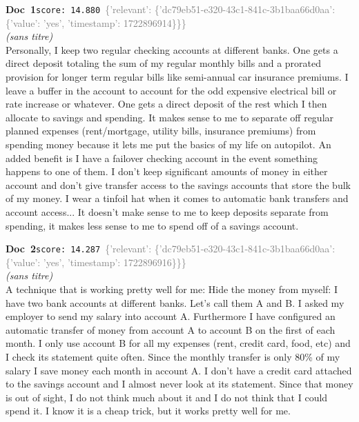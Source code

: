 \documentclass[a4paper,11pt]{article}
\begin{document}
\begin{docenv}
{\footnotesize\textcolor{doccolor}{\textbf{Doc~1}}}\hfill{\tiny\texttt{score:~14.880}}\ {\tiny\textcolor{gray}{\{'relevant': \{'dc79eb51-e320-43c1-841c-3b1baa66d0aa': \{'value': 'yes', 'timestamp': 1722896914\}\}\}}}\\[3pt]
{\small\textit{(sans titre)}}\\[2pt]
\vspace{2pt}
{\footnotesize 
Personally, I keep two regular checking accounts at different banks.  One gets a direct deposit totaling the sum of my regular monthly bills and a prorated provision for longer term regular bills like semi-annual car insurance premiums.  I leave a buffer in the account to account for the odd expensive electrical bill or rate increase or whatever.  One gets a direct deposit of the rest which I then allocate to savings and spending. It makes sense to me to separate off regular planned expenses (rent/mortgage, utility bills, insurance premiums) from spending money because it lets me put the basics of my life on autopilot.  An added benefit is I have a failover checking account in the event something happens to one of them.  I don't keep significant amounts of money in either account and don't give transfer access to the savings accounts that store the bulk of my money.  I wear a tinfoil hat when it comes to automatic bank transfers and account access... It doesn't make sense to me to keep deposits separate from spending, it makes less sense to me to spend off of a savings account.}
\end{docenv}
\begin{docenv}
{\footnotesize\textcolor{doccolor}{\textbf{Doc~2}}}\hfill{\tiny\texttt{score:~14.287}}\ {\tiny\textcolor{gray}{\{'relevant': \{'dc79eb51-e320-43c1-841c-3b1baa66d0aa': \{'value': 'yes', 'timestamp': 1722896916\}\}\}}}\\[3pt]
{\small\textit{(sans titre)}}\\[2pt]
\vspace{2pt}
{\footnotesize 
A technique that is working pretty well for me: Hide the money from myself: I have two bank accounts at different banks. Let's call them A and B. I asked my employer to send my salary into account A. Furthermore I have configured an automatic transfer of money from account A to account B on the first of each month.  I only use account B for all my expenses (rent, credit card, food, etc) and I check its statement quite often. Since the monthly transfer is only 80\% of my salary I save money each month in account A. I don't have a credit card attached to the savings account and I almost never look at its statement. Since that money is out of sight, I do not think much about it and I do not think that I could spend it. I know it is a cheap trick, but it works pretty well for me.}
\end{docenv}
\end{document}
